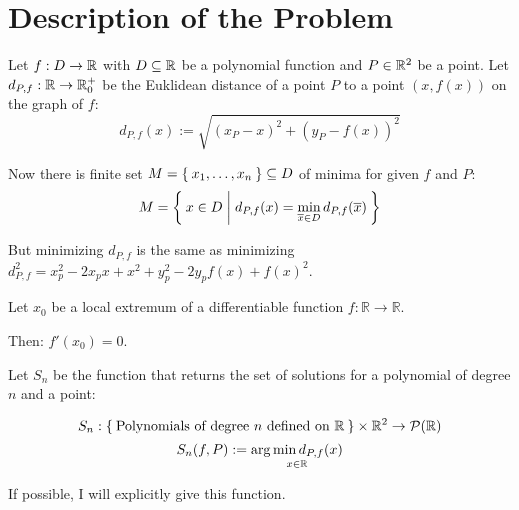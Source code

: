 \chapter{Description of the Problem}
Let $f: D \rightarrow \mathbb{R}$ with $D \subseteq \mathbb{R}$ be a polynomial function and $P \in \mathbb{R}^2$
be a point. Let $d_{P,f}: \mathbb{R} \rightarrow \mathbb{R}_0^+$
be the Euklidean distance of a point $P$ to a point $\left (x, f(x) \right )$
on the graph of $f$:
\[d_{P,f} (x) := \sqrt{(x_P - x)^2 + (y_P - f(x))^2}\]

Now there is finite set $M = \Set{x_1, \dots, x_n} \subseteq D$ of minima for given $f$ and $P$:
\[M = \Set{x \in D | d_{P,f}(x) = \min_{\overline{x} \in D} d_{P,f}(\overline{x})}\] 

But minimizing $d_{P,f}$ is the same as minimizing 
$d_{P,f}^2 = x_p^2 - 2x_p x + x^2 + y_p^2 - 2y_p f(x) + f(x)^2$.

\begin{theorem}\label{thm:required-extremum-property}
    Let $x_0$ be a local extremum of a differentiable function $f: \mathbb{R} \rightarrow \mathbb{R}$.

    Then: $f'(x_0) = 0$.
\end{theorem}

Let $S_n$ be the function that returns the set of solutions for a
polynomial of degree $n$ and a point:

\[S_n: \Set{\text{Polynomials of degree } n \text{ defined on } \ensuremath{\mathbb{R}}} \times \mathbb{R}^2 \rightarrow \mathcal{P}({\mathbb{R}})\]
\[S_n(f, P) := \underset{x\in\mathbb{R}}{\arg \min d_{P,f}(x)}\]

If possible, I will explicitly give this function.

